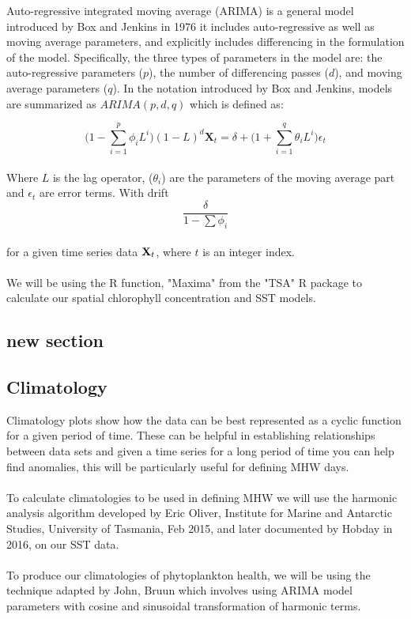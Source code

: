 Auto-regressive integrated moving average (ARIMA) is a general model introduced by Box and Jenkins in 1976 \cite{li1986fractional} it includes auto-regressive as well as moving average parameters, and explicitly includes differencing in the formulation of the model. Specifically, the three types of parameters in the model are: the auto-regressive parameters ($p$), the number of differencing passes ($d$), and moving average parameters ($q$). In the notation introduced by Box and Jenkins, models are summarized as $ARIMA(p,d,q)$ which is defined as:

\begin{equation*}
    \Big( 1 - \sum_{i=1}^p\phi_iL^i\Big)(1-L)^d\mathbf{X}_t = \delta + \Big(1+\sum_{i=1}^q\theta_i L^i\Big)\epsilon_t
\end{equation*}
\\
Where $L$ is the lag operator, ($\theta_i$) are the parameters of the moving average part and $\epsilon_t$ are error terms. With drift
\begin{equation*}
    \frac{\delta}{1-\sum\phi_i}
\end{equation*}
\\
for a given time series data $\bold{X}_t$, where $t$ is an integer index.
\\\\
We will be using the R function, "Maxima" from the "TSA" R package \cite{TSA} to calculate our spatial chlorophyll concentration and SST models.

\subsection{new section}

\subsection{Climatology}

Climatology plots show how the data can be best represented as a cyclic function for a given period of time. These can be helpful in establishing relationships between data sets and given a time series for a long period of time you can help find anomalies, this will be particularly useful for defining MHW days.
\\\\
To calculate climatologies to be used in defining MHW we will use the harmonic analysis algorithm developed by Eric Oliver, Institute for Marine and Antarctic Studies, University of Tasmania, Feb 2015, and later documented by Hobday in 2016, \cite{hobday2016hierarchical} on our SST data.
\\\\
To produce our climatologies of phytoplankton health, we will be using the technique adapted by John, Bruun \cite{bruun2017heartbeat} which involves using ARIMA model parameters with cosine and sinusoidal transformation of harmonic terms.

